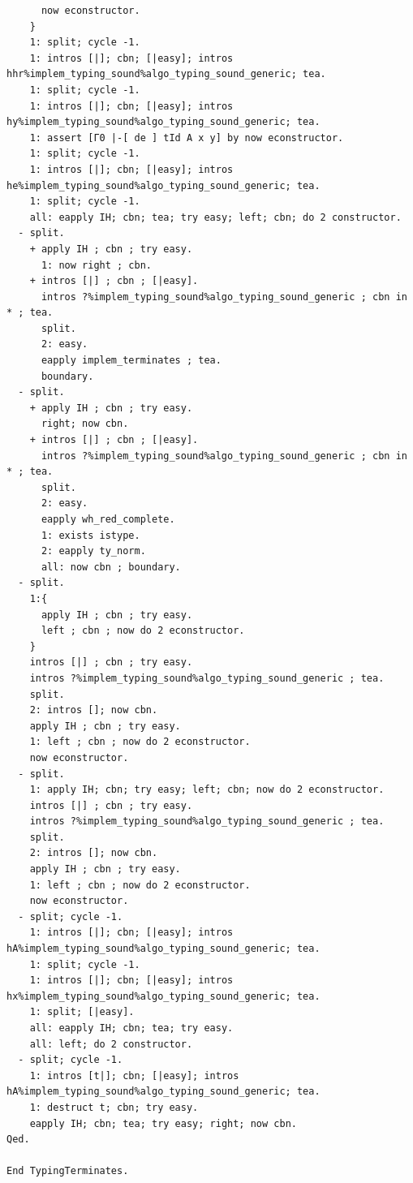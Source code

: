\documentclass[10pt,a4paper]{amsart}
\begin{document}
\begin{lstlisting}
      now econstructor.
    }
    1: split; cycle -1.
    1: intros [|]; cbn; [|easy]; intros hhr%implem_typing_sound%algo_typing_sound_generic; tea.
    1: split; cycle -1.
    1: intros [|]; cbn; [|easy]; intros hy%implem_typing_sound%algo_typing_sound_generic; tea.
    1: assert [Γ0 |-[ de ] tId A x y] by now econstructor.
    1: split; cycle -1.
    1: intros [|]; cbn; [|easy]; intros he%implem_typing_sound%algo_typing_sound_generic; tea.
    1: split; cycle -1.
    all: eapply IH; cbn; tea; try easy; left; cbn; do 2 constructor.
  - split.
    + apply IH ; cbn ; try easy.
      1: now right ; cbn.
    + intros [|] ; cbn ; [|easy].
      intros ?%implem_typing_sound%algo_typing_sound_generic ; cbn in * ; tea.
      split.
      2: easy.
      eapply implem_terminates ; tea.
      boundary.
  - split.
    + apply IH ; cbn ; try easy.
      right; now cbn.
    + intros [|] ; cbn ; [|easy].
      intros ?%implem_typing_sound%algo_typing_sound_generic ; cbn in * ; tea.
      split.
      2: easy.
      eapply wh_red_complete.
      1: exists istype.
      2: eapply ty_norm.
      all: now cbn ; boundary.
  - split.
    1:{
      apply IH ; cbn ; try easy.
      left ; cbn ; now do 2 econstructor.
    }
    intros [|] ; cbn ; try easy.
    intros ?%implem_typing_sound%algo_typing_sound_generic ; tea.
    split.
    2: intros []; now cbn.
    apply IH ; cbn ; try easy.
    1: left ; cbn ; now do 2 econstructor.
    now econstructor.
  - split.
    1: apply IH; cbn; try easy; left; cbn; now do 2 econstructor.
    intros [|] ; cbn ; try easy.
    intros ?%implem_typing_sound%algo_typing_sound_generic ; tea.
    split.
    2: intros []; now cbn.
    apply IH ; cbn ; try easy.
    1: left ; cbn ; now do 2 econstructor.
    now econstructor.
  - split; cycle -1.
    1: intros [|]; cbn; [|easy]; intros hA%implem_typing_sound%algo_typing_sound_generic; tea.
    1: split; cycle -1.
    1: intros [|]; cbn; [|easy]; intros hx%implem_typing_sound%algo_typing_sound_generic; tea.
    1: split; [|easy].
    all: eapply IH; cbn; tea; try easy.
    all: left; do 2 constructor.
  - split; cycle -1.
    1: intros [t|]; cbn; [|easy]; intros hA%implem_typing_sound%algo_typing_sound_generic; tea.
    1: destruct t; cbn; try easy.
    eapply IH; cbn; tea; try easy; right; now cbn.
Qed.

End TypingTerminates.
\end{lstlisting}
\end{document}
